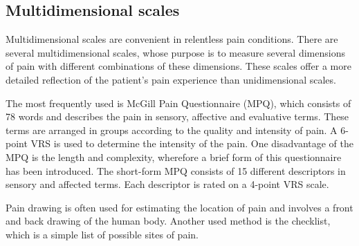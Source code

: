 \subsection{Multidimensional scales}
Multidimensional scales are convenient in relentless pain conditions. There are several  multidimensional scales, whose purpose is to measure several dimensions of pain with different combinations of these dimensions. These scales offer a more detailed reflection of the patient's pain experience than unidimensional scales. \cite{Briggs2010} 

The most frequently used is McGill Pain Questionnaire (MPQ), which consists of 78 words and describes the pain in sensory, affective and evaluative terms. These terms are arranged in groups according to the quality and intensity of pain. A 6-point VRS is used to determine the intensity of the pain. One disadvantage of the MPQ is the length and complexity, wherefore a brief form of this questionnaire has been introduced. The short-form MPQ consists of 15 different descriptors in sensory and affected terms. Each descriptor is rated on a 4-point VRS scale.~\cite{Katz2001}


Pain drawing is often used for estimating the location of pain and involves a front and back drawing of the human body. Another used method is the checklist, which is a simple list of possible sites of pain.~\cite{Jensen2001} 




